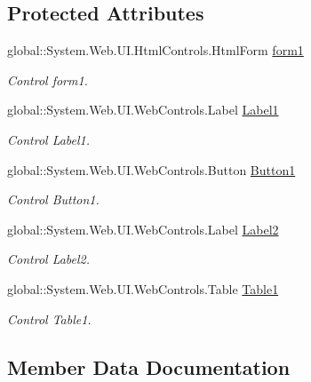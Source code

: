 \subsection*{Protected Attributes}
\begin{DoxyCompactItemize}
\item 
global\+::\+System.\+Web.\+U\+I.\+Html\+Controls.\+Html\+Form \mbox{\hyperlink{class_inicio_1_1_registrados_a902f9075b41d6386d17242fe32dea6e4}{form1}}
\begin{DoxyCompactList}\small\item\em Control form1. \end{DoxyCompactList}\item 
global\+::\+System.\+Web.\+U\+I.\+Web\+Controls.\+Label \mbox{\hyperlink{class_inicio_1_1_registrados_a89cbfd8509272c14e26ee466a11b7835}{Label1}}
\begin{DoxyCompactList}\small\item\em Control Label1. \end{DoxyCompactList}\item 
global\+::\+System.\+Web.\+U\+I.\+Web\+Controls.\+Button \mbox{\hyperlink{class_inicio_1_1_registrados_acef829ede3774fe5a9e0cf940d35e6ef}{Button1}}
\begin{DoxyCompactList}\small\item\em Control Button1. \end{DoxyCompactList}\item 
global\+::\+System.\+Web.\+U\+I.\+Web\+Controls.\+Label \mbox{\hyperlink{class_inicio_1_1_registrados_ab7c3cf09be993fe6a07f31881ba27159}{Label2}}
\begin{DoxyCompactList}\small\item\em Control Label2. \end{DoxyCompactList}\item 
global\+::\+System.\+Web.\+U\+I.\+Web\+Controls.\+Table \mbox{\hyperlink{class_inicio_1_1_registrados_a0c8cbd7625175b47e930f927da038acc}{Table1}}
\begin{DoxyCompactList}\small\item\em Control Table1. \end{DoxyCompactList}\end{DoxyCompactItemize}


\subsection{Member Data Documentation}
\mbox{\label{class_inicio_1_1_registrados_acef829ede3774fe5a9e0cf940d35e6ef}} 
